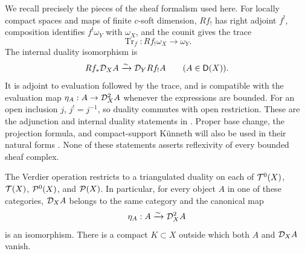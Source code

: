 We recall precisely the pieces of the sheaf formalism used here.  For
locally compact spaces and maps of finite $c$-soft dimension, $Rf_!$ has
right adjoint $f^!$, composition identifies $f^!\omega_Y$ with
$\omega_X$, and the counit gives the trace
\begin{equation}
 \label{cat:trace}
 \operatorname{Tr}_f:Rf_!\omega_X\longrightarrow\omega_Y.
\end{equation}
The internal duality isomorphism is
\begin{equation}
 \label{cat:verdier-formula}
 Rf_*\mathcal D_X A\xrightarrow{\sim}\mathcal D_Y Rf_!A
 \qquad(A\in\mathsf D(X)).
\end{equation}
It is adjoint to evaluation followed by the trace, and is compatible with
the evaluation map $\eta_A:A\to\mathcal D_X^2A$ whenever the expressions are
bounded.  For an open inclusion $j$, $j^!=j^{-1}$, so duality commutes
with open restriction.  These are the adjunction and internal duality
statements in \cite[Theorem~11.4.2, Propositions~11.4.3--11.4.4 and
11.4.6(b)]{SchapiraNotes}.  Proper base change, the projection formula,
and compact-support K\"unneth will also be used in their natural forms
\cite[Theorems~11.3.5--11.3.6 and Corollary~11.3.11]{SchapiraNotes}.
None of these statements asserts reflexivity of every bounded sheaf
complex.

\begin{proposition}
\label{prop:test-duality}
The Verdier operation restricts to a triangulated duality on each of
$\mathcal T^0(X)$, $\mathcal T(X)$, $\mathcal P^0(X)$, and $\mathcal P(X)$.  In particular, for
every object $A$ in one of these categories, $\mathcal D_X A$ belongs to the same
category and the canonical map
\[
 \eta_A:A\xrightarrow{\sim}\mathcal D_X^2A
\]
is an isomorphism.  There is a compact $K\subset X$ outside which both
$A$ and $\mathcal D_X A$ vanish.
\end{proposition}

